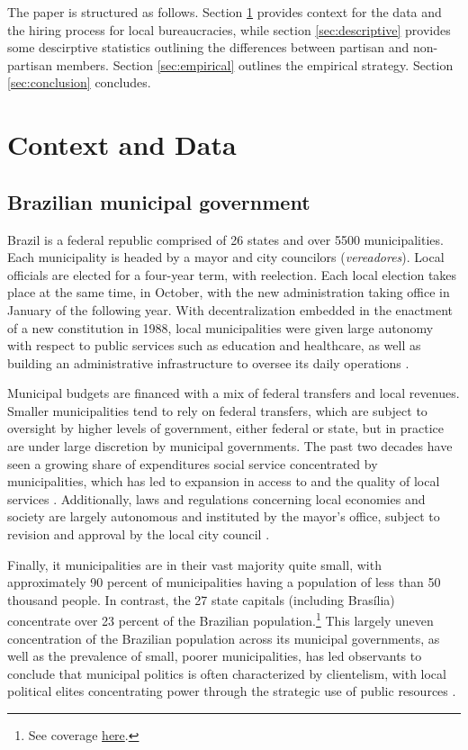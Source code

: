 \documentclass[12pt,a4paper]{article}
\begin{document}
The paper is structured as follows. Section \ref{sec:context} provides context for the data and the hiring process for local bureaucracies, while section \ref{sec:descriptive} provides some descirptive statistics outlining the differences between partisan and non-partisan members. Section \ref{sec:empirical} outlines the empirical strategy. Section \ref{sec:conclusion} concludes.

\section{Context and Data}
\label{sec:context}

\subsection{Brazilian municipal government}

Brazil is a federal republic comprised of 26 states and over 5500 municipalities. Each municipality is headed by a mayor and city councilors (\emph{vereadores}). Local officials are elected for a four-year term, with reelection. Each local election takes place at the same time, in October, with the new administration taking office in January of the following year. With decentralization embedded in the enactment of a new constitution in 1988, local municipalities were given large autonomy with respect to public services such as education and healthcare, as well as building an administrative infrastructure to oversee its daily operations \citep{souza2017modernizaccao}. 

Municipal budgets are financed with a mix of federal transfers and local revenues. Smaller municipalities tend to rely on federal transfers, which are subject to oversight by higher levels of government, either federal or state, but in practice are under large discretion by municipal governments. The past two decades have seen a growing share of expenditures social service concentrated by municipalities, which has led to expansion in access to and the quality of local services \citep{arretche2015trajetorias}. Additionally, laws and regulations concerning local economies and society are largely autonomous and instituted by the mayor's office, subject to revision and approval by the local city council \citep{brelaz2013processo}.

Finally, it municipalities are in their vast majority quite small, with approximately 90 percent of municipalities having a population of less than 50 thousand people. In contrast, the 27 state capitals (including Bras\'{i}lia) concentrate over 23 percent of the Brazilian population.\footnote{See coverage \href{https://www.google.com/search?q=tamanho+municipio+brasil+poulacao&source=lmns&hl=en&sa=X&ved=2ahUKEwjyiLjLh6buAhXFn-AKHbzEBxAQ_AUoAHoECAEQAA}{here}.} This largely uneven concentration of the Brazilian population across its municipal governments, as well as the prevalence of small, poorer municipalities, has led observants to conclude that municipal politics is often characterized by clientelism, with local political elites concentrating power through the strategic use of public resources \citep{leal2012coronelismo}.
\end{document}
